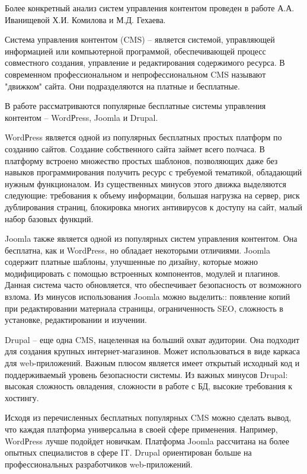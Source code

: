 Более конкретный анализ систем управления контентом проведен в работе \cite{ivanisheva-cms} А.А. Иванищевой Х.И. Комилова и М.Д. Гехаева.

Система управления контентом (CMS) -- является системой, управляющей информацией или компьютерной программой, обеспечивающей процесс совместного создания, управление и редактирования содержимого ресурса.
В современном профессиональном и непрофессиональном CMS называют "движком" сайта.
Они подразделяются на платные и бесплатные.

В работе рассматриваются популярные бесплатные системы управления контентом -- WordРress, Joomla
и Drupal.

WordРress является одной из популярных бесплатных простых платформ по созданию сайтов.
Создание собственного сайта займет всего полчаса.
В платформу встроено множество простых шаблонов, позволяющих даже без навыков программирования получить ресурс с требуемой тематикой, обладающий нужным функционалом.
Из существенных минусов этого движка выделяются следующие: требования к объему информации, большая нагрузка на сервер, риск дублирования страниц, блокировка многих антивирусов к доступу на сайт, малый набор базовых функций.

Joomla также является одной из популярных систем управления контентом.
Она бесплатна, как и WordРress, но обладает некоторыми отличиями.
Joomla содержит платные шаблоны, улучшенные по дизайну, которые можно модифицировать с помощью встроенных компонентов, модулей и плагинов.
Данная система часто обновляется, что обеспечивает безопасность от возможного взлома.
Из минусов использования Joomla можно выделить:: появление копий при редактировании материала страницы, ограниченность SEO, сложность в установке, редактировании и изучении.

Drupal -- еще одна CMS, нацеленная на больший охват аудитории.
Она подходит для создания крупных интернет-магазинов.
Может использоваться в виде каркаса для web-приложений.
Важным плюсом является имеет открытый исходный код и поддерживаемый уровень безопасности системы.
Из важных минусов Drupal: высокая сложность овладения, сложности в работе с БД, высокие требования к хостингу.

Исходя из перечисленных бесплатных популярных CMS можно сделать вывод, что каждая платформа универсальна в своей сфере применения.
Например, WordРress лучше подойдет новичкам.
Платформа Joomla рассчитана на более опытных специалистов в сфере IT.
Drupal ориентирован больше на профессиональных разработчиков web-приложений. 
\clearpage
